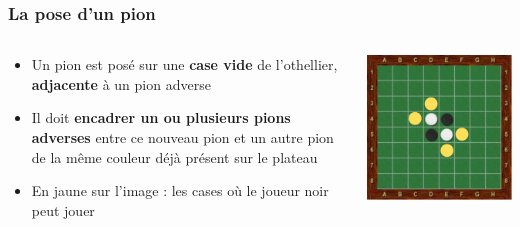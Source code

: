 \begin{frame}
\frametitle{La pose d’un pion}

\begin{columns}
    \begin{column}{0.65\textwidth}
        \begin{itemize}
            \item Un pion est posé sur une \textbf{case vide} de l’othellier, \textbf{adjacente} à un pion adverse
            \item Il doit \textbf{encadrer un ou plusieurs pions adverses} entre ce nouveau pion et un autre pion de la même couleur déjà présent sur le plateau
            \item En jaune sur l’image : les cases où le joueur noir peut jouer
        \end{itemize}    
    \end{column}
    
    \begin{column}{0.35\textwidth}
        \includegraphics[width=\linewidth]{img/othello-coup-possible.png}
    \end{column}
\end{columns}

\end{frame}

